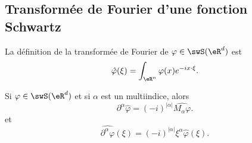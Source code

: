 \subsection{Transformée de Fourier d'une fonction Schwartz}

La définition de la transformée de Fourier de \( \varphi\in\swS(\eR^d)\) est 
\begin{equation}
    \hat  \varphi(\xi)=\int_{\eR^n}\varphi(x) e^{-ix\cdot \xi}.
\end{equation}

\begin{lemma}   \label{LemQPVQjCx}
    Si \( \varphi\in\swS(\eR^d)\) et si \( \alpha\) est un multiindice, alors
    \begin{equation}
        \partial^{\alpha}\hat\varphi=(-i)^{| \alpha |}\widehat{M_{\alpha}\varphi}.
    \end{equation}
    et
    \begin{equation}
        \widehat{\partial^{\alpha}\varphi}(\xi)=(-i)^{| \alpha |}\xi^{\alpha}\hat\varphi(\xi).
    \end{equation}
\end{lemma}

